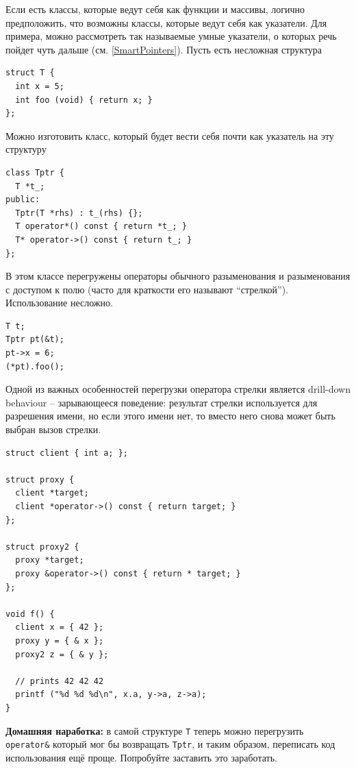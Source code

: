 \documentclass[a4paper,12pt,oneside]{article}
\begin{document}
Если есть классы, которые ведут себя как функции и массивы, логично предположить, что возможны классы, которые ведут себя как указатели. Для примера, можно рассмотреть так называемые умные указатели, о которых речь пойдет чуть дальше (см. \ref{SmartPointers}). Пусть есть несложная структура

\begin{lstlisting}
struct T {
  int x = 5;
  int foo (void) { return x; }
};
\end{lstlisting}

Можно изготовить класс, который будет вести себя почти как указатель на эту структуру

\begin{lstlisting}
class Tptr {
  T *t_;
public:
  Tptr(T *rhs) : t_(rhs) {};
  T operator*() const { return *t_; }
  T* operator->() const { return t_; }
};
\end{lstlisting}

В этом классе перегружены операторы обычного разыменования и разыменования с доступом к полю (часто для краткости его называют ``стрелкой''). Использование несложно.

\begin{lstlisting}
T t;
Tptr pt(&t);
pt->x = 6;
(*pt).foo();
\end{lstlisting}

Одной из важных особенностей перегрузки оператора стрелки является drill-down behaviour  -- зарывающееся поведение: результат стрелки используется для разрешения имени, но если этого имени нет, то вместо него снова может быть выбран вызов стрелки.

\begin{lstlisting}
struct client { int a; };

struct proxy {
  client *target;
  client *operator->() const { return target; }
};

struct proxy2 {
  proxy *target;
  proxy &operator->() const { return * target; }
};

void f() {
  client x = { 42 };
  proxy y = { & x };
  proxy2 z = { & y };

  // prints 42 42 42
  printf ("%d %d %d\n", x.a, y->a, z->a);    
}
\end{lstlisting}

\textbf{Домашняя наработка:} в самой структуре \lstinline!T! теперь можно перегрузить \lstinline!operator&! который мог бы возвращать \lstinline!Tptr!, и таким образом, переписать код использования ещё проще. Попробуйте заставить это заработать.
\end{document}
